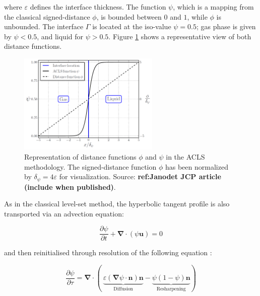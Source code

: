 where $\varepsilon$ defines the interface thickness. The function $\psi$, which is a mapping from the classical signed-distance $\phi$, is bounded between $0$ and $1$, while $\phi$ is unbounded. The interface $\Gamma$ is located at the iso-value $\psi = 0.5$; gas phase is given by $\psi < 0.5$, and liquid for $\psi > 0.5$. Figure \ref{fig:psi_phi_profiles_janodet_2021_JCP} shows a representative view of both distance functions.

\begin{figure}[ht]
    \centering
    \includegraphics[width=0.6\textwidth]{./part1_numerical_approaches/figures_ch2/ACLS_psi_phi_janodet_JCP}
       \centering
    \caption[Representation of distance functions $\phi$ and $\psi$ in the ACLS methodology]{Representation of distance functions $\phi$ and $\psi$ in the ACLS methodology. The signed-distance function $\phi$ has been normalized by $\delta_\psi = 4\varepsilon$ for visualization. Source: \textbf{ref:Janodet JCP article (include when published)}.}
    \label{fig:psi_phi_profiles_janodet_2021_JCP}
\end{figure}


As in the classical level-set method, the hyperbolic tangent profile is also transported via an advection equation:

\begin{equation}
    \frac{\partial \psi}{\partial t} + \boldsymbol{\nabla} \cdot \left( \psi \textbf{u} \right) = 0
\end{equation}

and then reinitialised through resolution of the following equation :


\begin{equation}
\label{eq:acls_reinit_2008}
\frac{\partial\psi}{\partial \tau}=\boldsymbol{\nabla}\cdot(\ \underbrace{\varepsilon(\boldsymbol{\nabla}\psi\cdot\textbf{n})\textbf{n}}_{\mathrm{Diffusion}}-\underbrace{\psi(1-\psi)\textbf{n}}_{\mathrm{Resharpening}})
\end{equation}

